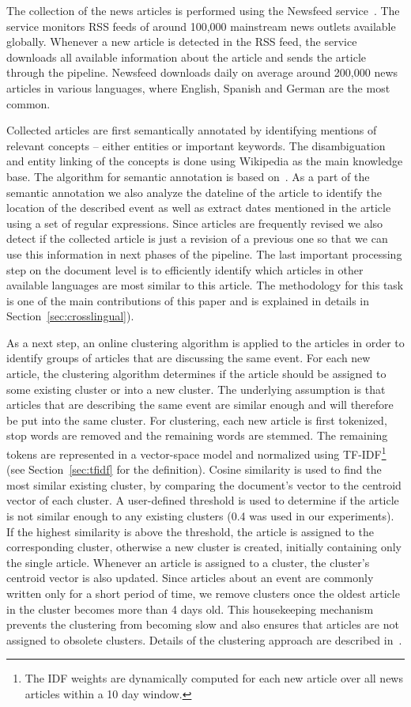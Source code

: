 \documentclass[twoside,11pt]{article}
\begin{document}
The collection of the news articles is performed using the Newsfeed service~\cite{Trampus2012}. The service monitors RSS feeds of around 100,000 mainstream news outlets available globally. Whenever a new article is detected in the RSS feed, the service downloads all available information about the article and sends the article through the pipeline. Newsfeed downloads daily on average around 200,000 news articles in various languages, where English, Spanish and German are the most common.

Collected articles are first semantically annotated by identifying mentions of relevant concepts -- either entities or important keywords. The disambiguation and entity linking of the concepts is done using Wikipedia as the main knowledge base. The algorithm for semantic annotation is based on~\cite{zhang2014saaacamactat}. As a part of the semantic annotation we also analyze the dateline of the article to identify the location of the described event as well as extract dates mentioned in the article using a set of regular expressions. Since articles are frequently revised we also detect if the collected article is just a revision of a previous one so that we can use this information in next phases of the pipeline. The last important processing step on the document level is to efficiently identify which articles in other available languages are most similar to this article. The methodology for this task is one of the main contributions of this paper and is explained in details in Section~\ref{sec:crosslingual}).

As a next step, an online clustering algorithm is applied to the articles in order to identify groups of articles that are discussing the same event. For each new article, the clustering algorithm determines if the article should be assigned to some existing cluster or into a new cluster. The underlying assumption is that articles that are describing the same event are similar enough and will therefore be put into the same cluster. For clustering, each new article is first tokenized, stop words are removed and the remaining words are stemmed.
The remaining tokens are represented in a vector-space model and normalized using TF-IDF\footnote{The IDF weights are dynamically computed for each new article over all news articles within a 10 day window.} (see Section~\ref{sec:tfidf} for the definition). Cosine similarity is used to find the most similar existing cluster, by comparing the document's vector to the centroid vector of each cluster. A user-defined threshold is used to determine if the article is not similar enough to any existing clusters (0.4 was used in our experiments).  If the highest similarity is above the threshold, the article is assigned to the corresponding cluster, otherwise a new cluster is created, initially containing only the single article. Whenever an article is assigned to a cluster, the cluster's centroid vector is also updated. Since articles about an event are commonly written only for a short period of time, we remove clusters once the oldest article in the cluster becomes more than 4 days old. This housekeeping mechanism prevents the clustering from becoming slow and also ensures that articles are not assigned to obsolete clusters. Details of the clustering approach are described in~\cite{brank2014}.
\end{document}
